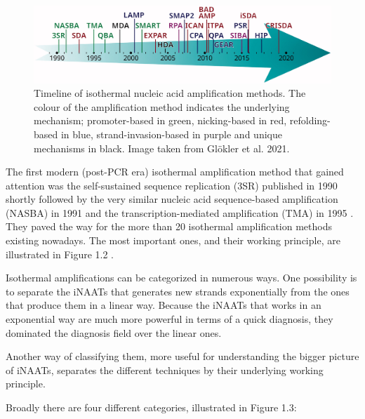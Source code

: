 \begin{figure}[b]
    \centering
    \includegraphics[width=1\textwidth]{data/iso_amp_methods.pdf}
    \caption[Timeline of isothermal nucleic acid amplification methods.]{Timeline of isothermal nucleic acid amplification methods. The colour of the amplification method indicates the underlying mechanism; promoter-based in green, nicking-based in red, refolding-based in blue, strand-invasion-based in purple and unique mechanisms in black. Image taken from Glökler et al. 2021\cite{glokler_isothermal_2021}.}
    \label{fig:iso_amp_methods}
\end{figure}

The first modern (post-PCR era) isothermal amplification method that gained attention was the self-sustained sequence replication (3SR) published in 1990 \cite{guatelli_isothermal_1990} shortly followed by the very similar nucleic acid sequence-based amplification (NASBA) in 
1991 \cite{compton_nucleic_1991} and the transcription-mediated amplification (TMA) in 1995 \cite{kacian_nucleic_1995}. They paved the way for the more than 20 isothermal amplification methods existing nowadays. The most important ones, and their working principle, are illustrated in Figure 1.2 \cite{glokler_isothermal_2021}.


Isothermal amplifications can be categorized in numerous ways. One possibility is to separate the iNAATs that generates new strands exponentially from the ones that produce them in a linear way. Because the iNAATs that works in an exponential way are much more powerful in terms of a quick diagnosis, they dominated the diagnosis field over the linear ones.

Another way of classifying them, more useful for understanding the bigger picture of iNAATs, separates the different techniques by their underlying working principle\cite{glokler_isothermal_2021}. \linebreak

Broadly there are four different categories, illustrated in Figure 1.3:


